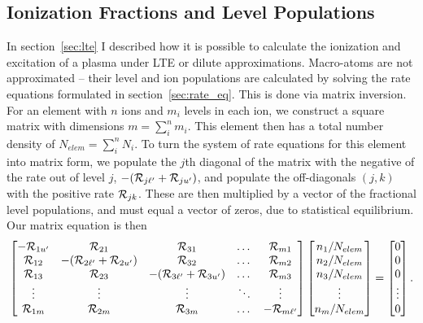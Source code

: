 



\subsection{Ionization Fractions and Level Populations}
\label{sec:matom_pops}
In section~\ref{sec:lte} I described how it is possible to calculate the
ionization and excitation of a plasma under LTE or dilute approximations.
Macro-atoms are not approximated -- their level and ion populations are 
calculated by solving the rate equations formulated in section~\ref{sec:rate_eq}. 
This is done via matrix inversion. For an element with $n$ ions and $m_i$
levels in each ion, we construct a square matrix with dimensions 
$m = \sum_i^n m_i$.
This element then has a total number density of $N_{elem} = \sum_i^n N_i$.
To turn the system of rate equations for this element into matrix form, we
populate the $j$th diagonal of the matrix with the negative of the rate out of
level $j$, $-({\cal R}_{j{\ell^\prime}} + {\cal R}_{j{u^\prime}})$, 
and populate the off-diagonals $(j,k)$ with the positive rate 
${\cal R}_{jk}$. These are then multiplied by a vector of the fractional level
populations, and must equal a vector of zeros, due to statistical equilibrium.
Our matrix equation is then
%
\begin{equation}
\begin{bmatrix}
    -{\cal R}_{1{u^\prime}} & {\cal R}_{21} & {\cal R}_{31} & \dots & {\cal R}_{m1} \\
    {\cal R}_{12} & -({\cal R}_{2{\ell^\prime}} + {\cal R}_{2{u^\prime}}) & {\cal R}_{32} & \dots & {\cal R}_{m2} \\
    {\cal R}_{13}  & {\cal R}_{23} & -({\cal R}_{3{\ell^\prime}} + {\cal R}_{3{u^\prime}}) & \dots & {\cal R}_{m3} \\
    \vdots & \vdots & \vdots & \ddots & \vdots \\
    {\cal R}_{1m}      & {\cal R}_{2m} & {\cal R}_{3m} & \dots & -{\cal R}_{m{\ell^\prime}}
\end{bmatrix}
\begin{bmatrix}
    n_1 / N_{elem} \\
    n_2 / N_{elem} \\
    n_3 / N_{elem} \\
    \vdots         \\
    n_m / N_{elem} 
\end{bmatrix}
=
\begin{bmatrix}
    0 \\
    0 \\
    0 \\
    \vdots \\
    0
\end{bmatrix}
.
\end{equation}
